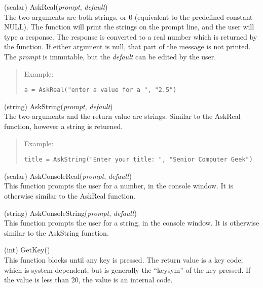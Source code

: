 \begin{description}
\item{(scalar) \vt AskReal({\it prompt}, {\it default\/})}\\
The two arguments are both strings, or 0 (equivalent to the predefined
constant {\vt NULL}).  The function will print the strings on the
prompt line, and the user will type a response.  The response is
converted to a real number which is returned by the function.  If
either argument is null, that part of the message is not printed.  The
{\it prompt} is immutable, but the {\it default} can be edited by the
user. 
\begin{quotation}
\noindent
Example:
\begin{verbatim}
a = AskReal("enter a value for a ", "2.5")
\end{verbatim}
\end{quotation}

\item{(string) \vt AskString({\it prompt\/}, {\it default\/})}\\
The two arguments and the return value are strings.  Similar to
the {\vt AskReal} function, however a string is returned.
\begin{quotation}
\noindent
Example:
\begin{verbatim}
title = AskString("Enter your title: ", "Senior Computer Geek")
\end{verbatim}
\end{quotation}

\item{(scalar) \vt AskConsoleReal({\it prompt\/}, {\it default\/})}\\
This function prompts the user for a number, in the console window. 
It is otherwise similar to the {\vt AskReal} function. 

\item{(string) \vt AskConsoleString({\it prompt\/}, {\it default\/})}\\
This function prompts the user for a string, in the console window. 
It is otherwise similar to the {\vt AskString} function.

\item{(int) \vt GetKey()}\\
This function blocks until any key is pressed.  The return value is a
key code, which is system dependent, but is generally the ``keysym''
of the key pressed.  If the value is less than 20, the value is an
internal code.

\end{description}


